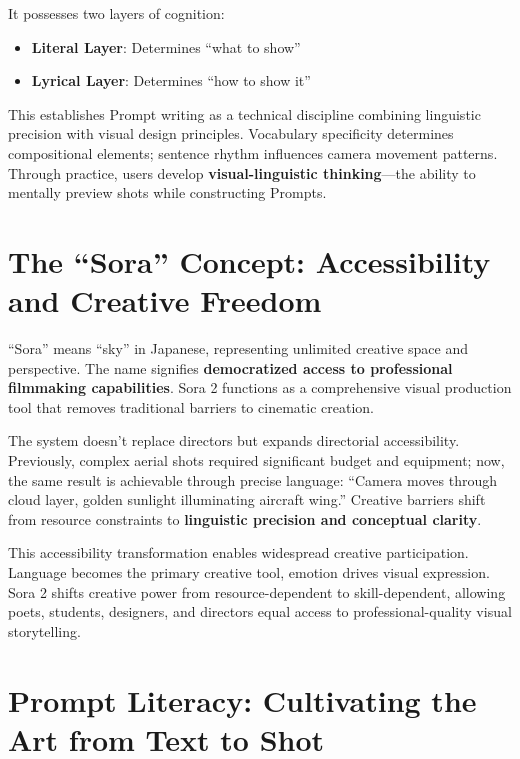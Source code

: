 It possesses two layers of cognition:

\begin{itemize}
\item \textbf{Literal Layer}: Determines ``what to show''
\item \textbf{Lyrical Layer}: Determines ``how to show it''
\end{itemize}

This establishes Prompt writing as a technical discipline combining linguistic precision with visual design principles. Vocabulary specificity determines compositional elements; sentence rhythm influences camera movement patterns. Through practice, users develop \textbf{visual-linguistic thinking}---the ability to mentally preview shots while constructing Prompts.

\section{The ``Sora'' Concept: Accessibility and Creative Freedom}

``Sora'' means ``sky'' in Japanese, representing unlimited creative space and perspective. The name signifies \textbf{democratized access to professional filmmaking capabilities}. Sora 2 functions as a comprehensive visual production tool that removes traditional barriers to cinematic creation.

The system doesn't replace directors but expands directorial accessibility. Previously, complex aerial shots required significant budget and equipment; now, the same result is achievable through precise language: ``Camera moves through cloud layer, golden sunlight illuminating aircraft wing.'' Creative barriers shift from resource constraints to \textbf{linguistic precision and conceptual clarity}.

This accessibility transformation enables widespread creative participation. Language becomes the primary creative tool, emotion drives visual expression. Sora 2 shifts creative power from resource-dependent to skill-dependent, allowing poets, students, designers, and directors equal access to professional-quality visual storytelling.

\section{Prompt Literacy: Cultivating the Art from Text to Shot}

